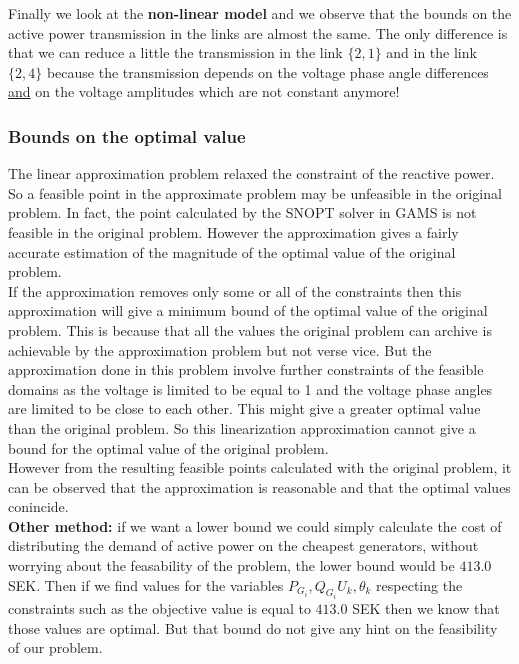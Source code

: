 Finally we look at the \textbf{non-linear model} and we observe that the bounds on the active power transmission in the links are almost the same. The only difference is that we can reduce a little the transmission in the link $\{2,1\}$ and in the link $\{2,4\}$ because the transmission depends on the voltage phase angle differences \underline{and} on the voltage amplitudes which are not constant anymore!

\subsubsection*{Bounds on the optimal value}

The linear approximation problem relaxed the constraint of the reactive power. So a feasible point in the approximate problem may be unfeasible in the original problem. In fact, the point calculated by the SNOPT solver in GAMS is not feasible in the original problem. However the approximation gives a fairly accurate estimation of the magnitude of the optimal value of the original problem.\\ 

If the approximation removes only some or all of the constraints then this approximation will give a minimum bound of the optimal value of the original problem. This is because that all the values the original problem can archive is achievable by the approximation problem but not verse vice. But the approximation done in this problem involve further constraints of the feasible domains as the voltage is limited to be equal to 1 and the voltage phase angles are limited to be close to each other. This might give a greater optimal value than the original problem. So this linearization approximation cannot give a bound for the optimal value of the original problem.\\ 

However from the resulting feasible points calculated with the original problem, it can be observed that the approximation is reasonable and that the optimal values conincide. \\

\textbf{Other method:} if we want a lower bound we could simply calculate the cost of distributing the demand of active power on the cheapest generators, without worrying about the feasability of the problem, the lower bound would be $413.0$ SEK. Then if we find values for the variables $P_{G_i}, Q_{G_i} U_k, \theta_k$ respecting the constraints such as the objective value is equal to $413.0$ SEK then we know that those values are optimal. But that bound do not give any hint on the feasibility of our problem.
